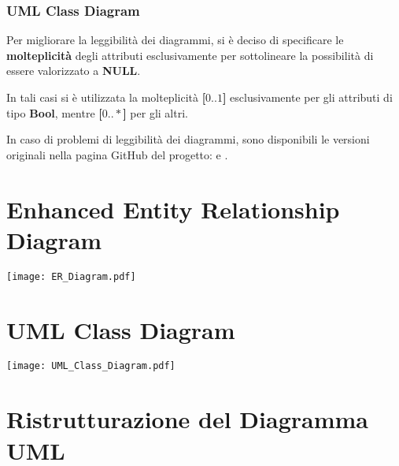 \subsubsection{UML Class Diagram}

Per migliorare la leggibilità dei diagrammi, si è deciso di specificare le \textbf{molteplicità} degli attributi esclusivamente per sottolineare la possibilità di essere valorizzato a \textbf{NULL}. 

In tali casi si è utilizzata la molteplicità \textbf{[\(0..1\)]} esclusivamente per gli attributi di tipo \textbf{Bool}, mentre \textbf{[\(0..*\)]} per gli altri.

\bigskip

\begin{note}
  In caso di problemi di leggibilità dei diagrammi, sono disponibili le versioni originali nella pagina GitHub del progetto:
   e .
\end{note}

\newpage

\section{Enhanced Entity Relationship Diagram}
\begin{center}
  \texttt{[image: ER\_Diagram.pdf]}
\end{center}


\section{UML Class Diagram}
\begin{center}
  \texttt{[image: UML\_Class\_Diagram.pdf]}
\end{center}

\newpage

\section{Ristrutturazione del Diagramma UML}

